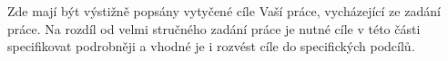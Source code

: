 Zde mají být výstižně popsány vytyčené cíle Vaší práce, vycházející ze zadání práce. 
Na rozdíl od velmi stručného zadání práce je nutné cíle v této části specifikovat podrobněji a vhodné je i rozvést cíle do specifických podcílů.
